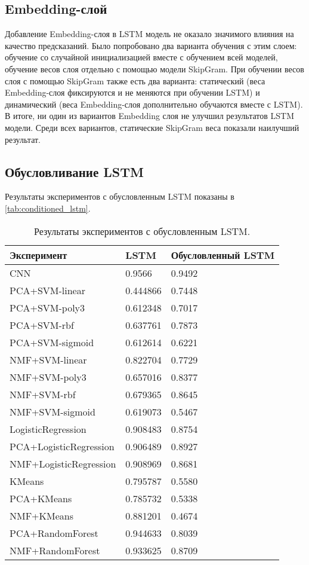 \subsection{Embedding-слой}

Добавление Embedding-слоя в LSTM модель не оказало значимого влияния на качество предсказаний. Было попробовано два варианта обучения с этим слоем: обучение со случайной инициализацией вместе с обучением всей моделей, обучение весов слоя отдельно с помощью модели SkipGram. При обучении весов слоя с помощью SkipGram также есть два варианта: статический (веса Embedding-слоя фиксируются и не меняются при обучении LSTM) и динамический (веса Embedding-слоя дополнительно обучаются вместе с LSTM).\\
В итоге, ни один из вариантов Embedding слоя не улучшил результатов LSTM модели. Среди всех вариантов, статические SkipGram веса показали наилучший результат.

\subsection{Обусловливание LSTM}

Результаты экспериментов с обусловленным LSTM показаны в \autoref{tab:conditioned_lstm}.

\begin{table}[H]
	\centering
	\begin{tabular}{ |p{6cm}||p{3cm}|p{3cm}| }
	 \hline
	 \rowfont{\scriptsize}%
	 \textbf{Эксперимент} & \rowfont{\scriptsize}\textbf{LSTM} & \rowfont{\scriptsize}\textbf{Обусловленный LSTM}\\
	 \hline\hline
	 \rowfont{\normalsize}%
	CNN & 0.9566 & 0.9492\\
	\hline
	PCA+SVM-linear & 0.444866 & 0.7448\\
	PCA+SVM-poly3 & 0.612348 & 0.7017\\
	PCA+SVM-rbf & 0.637761 & 0.7873\\
	PCA+SVM-sigmoid & 0.612614 & 0.6221\\
	\hline
	NMF+SVM-linear & 0.822704 & 0.7729\\
	NMF+SVM-poly3 & 0.657016 & 0.8377\\
	NMF+SVM-rbf & 0.679365 & 0.8645\\
	NMF+SVM-sigmoid & 0.619073 & 0.5467\\
	\hline
	LogisticRegression & 0.908483 & 0.8754 \\
	PCA+LogisticRegression & 0.906489 & 0.8927 \\
	NMF+LogisticRegression & 0.908969 & 0.8681 \\
	\hline
	KMeans & 0.795787 & 0.5580 \\
	PCA+KMeans & 0.785732 & 0.5338 \\
	NMF+KMeans & 0.881201 & 0.4674 \\
	\hline
	PCA+RandomForest & 0.944633 & 0.8039 \\
	NMF+RandomForest & 0.933625 & 0.8709 \\
	\hline
	\end{tabular}
	\caption{Результаты экспериментов с обусловленным LSTM.}
	\label{tab:conditioned_lstm}
\end{table}

